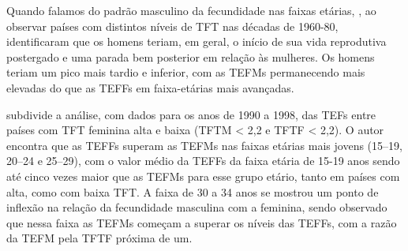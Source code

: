 
Quando falamos do padrão masculino da fecundidade nas faixas etárias, , ao observar países com distintos níveis de TFT nas décadas de 1960-80, identificaram que os homens teriam, em geral, o início de sua vida reprodutiva postergado e uma parada bem posterior em relação às mulheres. Os homens teriam um pico mais tardio e inferior, com as TEFMs permanecendo mais elevadas do que as TEFFs em faixa-etárias mais avançadas. 

 subdivide a análise, com dados para os anos de 1990 a 1998, das TEFs entre países com TFT feminina alta e baixa (TFTM < 2,2 e TFTF < 2,2). O autor encontra que as TEFFs superam as TEFMs nas faixas etárias mais jovens (15–19, 20–24 e 25–29), com o valor médio da TEFFs da faixa etária de 15-19 anos sendo até cinco vezes maior que as TEFMs para esse grupo etário, tanto em países com alta, como com baixa TFT. A faixa de 30 a 34 anos se mostrou um ponto de inflexão na relação da fecundidade masculina com a feminina, sendo observado que nessa faixa as TEFMs começam a superar os níveis das TEFFs, com a razão da TEFM pela TFTF próxima de um. 

